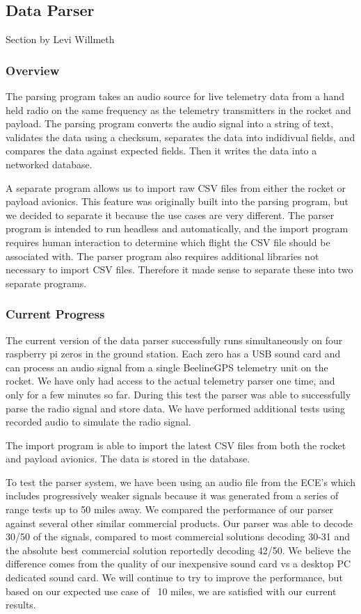 \documentclass[onecolumn, draftclsnofoot, 10pt, compsoc]{IEEEtran}
\begin{document}

\subsection{Data Parser}
Section by Levi Willmeth
\subsubsection{Overview}
The parsing program takes an audio source for live telemetry data from a hand held radio on the same frequency as the telemetry transmitters in the rocket and payload.  The parsing program converts the audio signal into a string of text, validates the data using a checksum, separates the data into indidivual fields, and compares the data against expected fields.  Then it writes the data into a networked database.

A separate program allows us to import raw CSV files from either the rocket or payload avionics.  This feature was originally built into the parsing program, but we decided to separate it because the use cases are very different.  The parser program is intended to run headless and automatically, and the import program requires human interaction to determine which flight the CSV file should be associated with.  The parser program also requires additional libraries not necessary to import CSV files.  Therefore it made sense to separate these into two separate programs.

\subsubsection{Current Progress}
The current version of the data parser successfully runs simultaneously on four raspberry pi zeros in the ground station.  Each zero has a USB sound card and can process an audio signal from a single BeelineGPS telemetry unit on the rocket.  We have only had access to the actual telemetry parser one time, and only for a few minutes so far.  During this test the parser was able to successfully parse the radio signal and store data.  We have performed additional tests using recorded audio to simulate the radio signal.

The import program is able to import the latest CSV files from both the rocket and payload avionics.  The data is stored in the database.

To test the parser system, we have been using an audio file from the ECE's which includes progressively weaker signals because it was generated from a series of range tests up to 50 miles away.  We compared the performance of our parser against several other similar commercial products.  Our parser was able to decode 30/50 of the signals, compared to most commercial solutions decoding 30-31 and the absolute best commercial solution reportedly decoding 42/50.  We believe the difference comes from the quality of our inexpensive sound card vs a desktop PC dedicated sound card. We will continue to try to improve the performance, but based on our expected use case of ~10 miles, we are satisfied with our current results.
\end{document}

